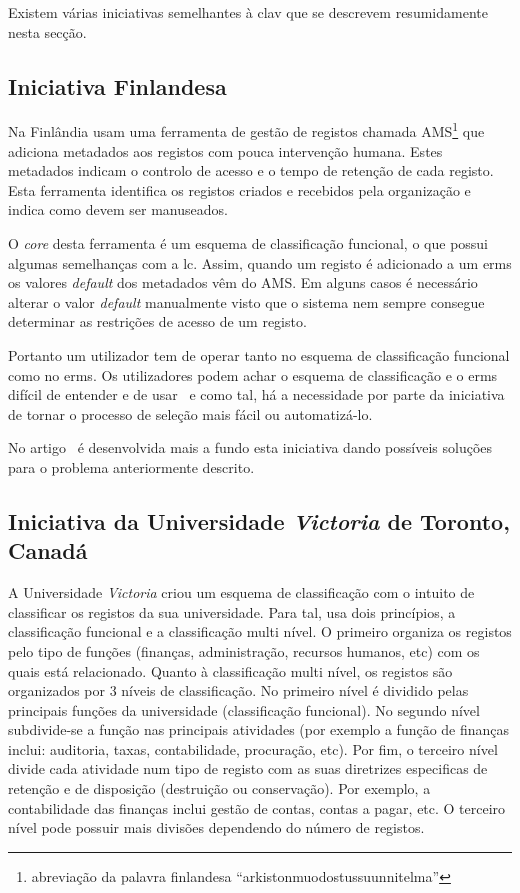 Existem várias iniciativas semelhantes à \acrshort{clav} que se descrevem resumidamente nesta secção.

\subsection{Iniciativa Finlandesa}
Na Finlândia usam uma ferramenta de gestão de registos chamada 
AMS\footnote{abreviação da palavra finlandesa ``arkistonmuodostussuunnitelma''} que adiciona metadados aos 
registos com pouca intervenção humana. Estes metadados indicam o controlo de acesso e o tempo de retenção de cada 
registo. Esta ferramenta identifica os registos criados e recebidos pela organização e indica como devem ser 
manuseados. 

O \textit{core} desta ferramenta é um esquema de classificação funcional, o que possui algumas semelhanças com a 
\acrshort{lc}. Assim, quando um registo é adicionado a um \acrfull{erms} os valores \textit{default} 
dos metadados vêm do AMS. Em alguns casos é necessário alterar o valor \textit{default} manualmente visto que o 
sistema nem sempre consegue determinar as restrições de acesso de um registo.

Portanto um utilizador tem de operar tanto no esquema de classificação funcional como no \acrshort{erms}. 
Os utilizadores podem achar o esquema de classificação e o \acrshort{erms} difícil de entender e de 
usar~\cite{finInit} e como tal, há a necessidade por parte da iniciativa de tornar o processo de seleção mais 
fácil ou automatizá-lo. 

No artigo~\cite{finInit} é desenvolvida mais a fundo esta iniciativa dando possíveis soluções para o problema 
anteriormente descrito.

\subsection{Iniciativa da Universidade \textit{Victoria} de Toronto, Canadá}

A Universidade \textit{Victoria} criou um esquema de classificação com o intuito de classificar os registos da 
sua universidade. Para tal, usa dois princípios, a classificação funcional e a classificação multi nível. 
O primeiro organiza os registos pelo tipo de funções (finanças, administração, recursos humanos, etc) com os quais 
está relacionado. Quanto à classificação multi nível, os registos são organizados por 3 níveis de classificação. 
No primeiro nível é dividido pelas principais funções da universidade (classificação funcional). 
No segundo nível subdivide-se a função nas principais atividades (por exemplo a função de finanças inclui: 
auditoria, taxas, contabilidade, procuração, etc). Por fim, o terceiro nível divide cada atividade num tipo de 
registo com as suas diretrizes especificas de retenção e de disposição (destruição ou conservação). 
Por exemplo, a contabilidade das finanças inclui gestão de contas, contas a pagar, etc. 
O terceiro nível pode possuir mais divisões dependendo do número de registos.~\cite{uniInit} 

